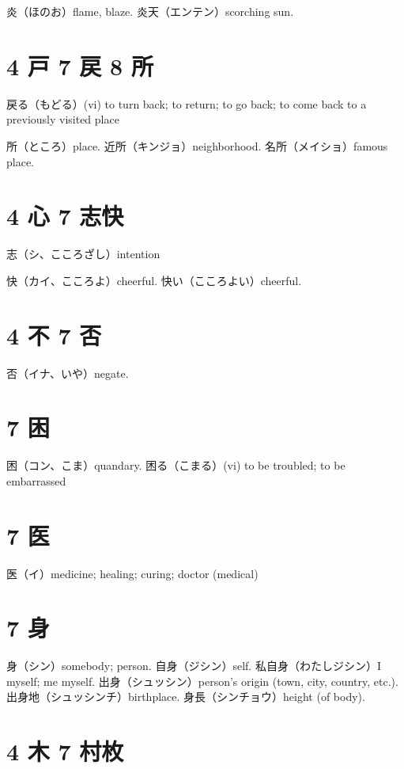 炎（ほのお）flame, blaze.
炎天（エンテン）scorching sun.

\section{4 戸 7 戻 8 所}

戻る（もどる）(vi) to turn back; to return; to go back;
to come back to a previously visited place

所（ところ）place.
近所（キンジョ）neighborhood.
名所（メイショ）famous place.

\section{4 心 7 志快}

志（シ、こころざし）intention

快（カイ、こころよ）cheerful.
快い（こころよい）cheerful.

\section{4 不 7 否}

否（イナ、いや）negate.

\section{7 困}

困（コン、こま）quandary.
困る（こまる）(vi) to be troubled; to be embarrassed

\section{7 医}

医（イ）medicine; healing; curing; doctor (medical)

\section{7 身}

身（シン）somebody; person.
自身（ジシン）self.
私自身（わたしジシン）I myself; me myself.
出身（シュッシン）person's origin (town, city, country, etc.).
出身地（シュッシンチ）birthplace.
身長（シンチョウ）height (of body).

\section{4 木 7 村枚}

